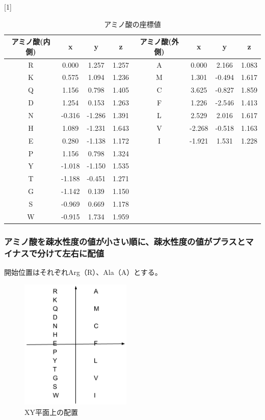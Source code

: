 \documentclass[a4paper,12pt]{jsreport}
\begin{document}
\begin{table}[H]
\centering
\caption{アミノ酸の座標値}
\scalebox{1}[1]{
\begin{tabular}{|cccc|cccc|} \hline
アミノ酸(内側) & x & y & z & アミノ酸(外側) & x & y & z \\ \hline
R & 0.000 & 1.257 & 1.257 & A & 0.000 & 2.166 & 1.083 \\[-2mm]
K & 0.575 & 1.094 & 1.236 & M & 1.301 & -0.494 & 1.617 \\[-2mm]
Q & 1.156 & 0.798 & 1.405 & C & 3.625 & -0.827 & 1.859 \\[-2mm]
D & 1.254 & 0.153 & 1.263 & F & 1.226 & -2.546 & 1.413 \\[-2mm]
N & -0.316 & -1.286 & 1.391 & L & 2.529 & 2.016 & 1.617 \\[-2mm]
H & 1.089 & -1.231 & 1.643 & V & -2.268 & -0.518 & 1.163 \\[-2mm]
E & 0.280 & -1.138 & 1.172 & I & -1.921 & 1.531 & 1.228 \\[-2mm]
P & 1.156 & 0.798 & 1.324 &&&& \\[-2mm]
Y & -1.018 & -1.150 & 1.535 &&&& \\[-2mm]
T & -1.188 & -0.451 & 1.271 &&&& \\[-2mm]
G & -1.142 & 0.139 & 1.150 &&&& \\[-2mm]
S & -0.969 & 0.669 & 1.178 &&&& \\[-2mm]
W & -0.915 & 1.734 & 1.959 &&&& \\ \hline
\end{tabular}
}
\end{table}

\subsubsection{アミノ酸を疎水性度の値が小さい順に、疎水性度の値がプラスとマイナスで分けて左右に配値}
開始位置はそれぞれArg（R）、Ala（A）とする。

\begin{figure}[H]
\centering
\includegraphics[width=53mm]{pic03.png}
\caption{XY平面上の配置}
\end{figure}
\end{document}
